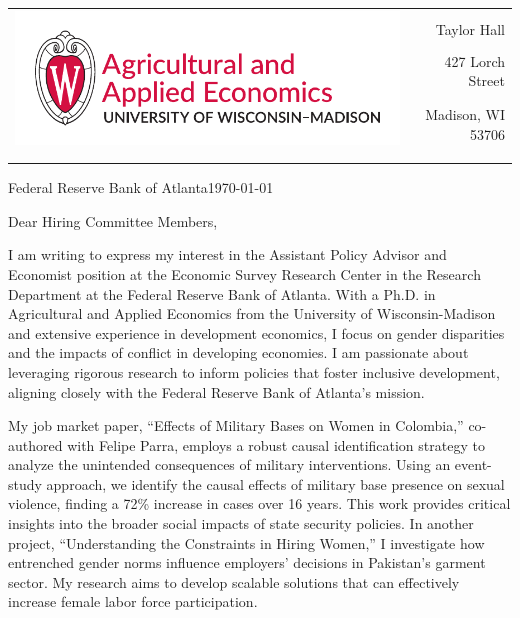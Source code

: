 \documentclass[12pt]{letter}
\begin{document}
\begin{tabularx}{\textwidth}{Xr}
\multirow{4}{*}{\includegraphics[height=3\baselineskip]{logo_cropped.pdf}} &  \\
& Taylor Hall \\
& 427 Lorch Street \\
& Madison, WI 53706 \\
[-1.8ex]\\
\\
\end{tabularx}

\newcommand{\instName}{Federal Reserve Bank of Atlanta}
\newcommand{\posName}{Assistant Policy Advisor and Economist}


\instName \hfill \today \\

\medskip

Dear Hiring Committee Members,

I am writing to express my interest in the \posName \hspace{1mm} position at the Economic Survey Research Center in the Research Department at the \instName. 
With a Ph.D. in Agricultural and Applied Economics from the University of Wisconsin-Madison and extensive experience 
in development economics, I focus on gender disparities and the impacts of conflict in developing economies. 
I am passionate about leveraging rigorous research to inform policies that foster inclusive development, 
aligning closely with the \instName's mission.

My job market paper, ``Effects of Military Bases on Women in Colombia,'' co-authored with Felipe Parra, employs 
a robust causal identification strategy to analyze the unintended consequences of military interventions. 
Using an event-study approach, we identify the causal effects of military base presence on sexual violence, finding 
a 72\% increase in cases over 16 years. This work provides critical insights into the broader social impacts of 
state security policies. In another project, ``Understanding the Constraints in Hiring Women,'' I investigate how entrenched gender 
norms influence employers' decisions in Pakistan's garment sector. 
My research aims to develop scalable solutions that can effectively increase female labor force participation.
\end{document}
